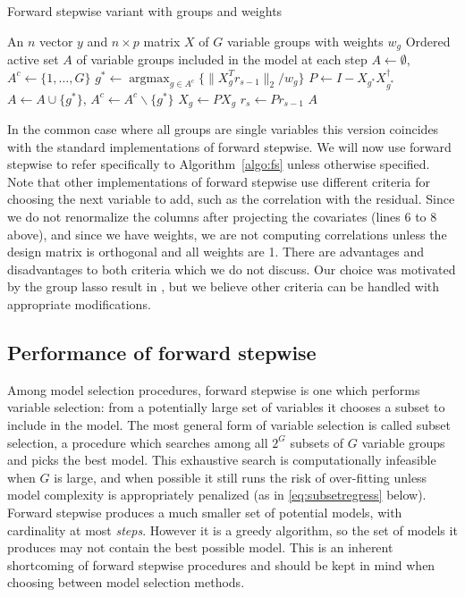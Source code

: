 \documentclass{imsart}
\newcommand{\argmax}{\mathop{\mathrm{argmax}}}
\newcommand{\norm}[1]{\lVert #1 \rVert}
\begin{document}
\begin{algorithm}
  \caption{Forward stepwise variant with groups and weights}
  \label{algo:fs}
  \begin{algorithmic}[1]
    \REQUIRE An $n$ vector $y$ and $n \times p$ matrix $X$ of $G$ variable groups with weights $w_g$
    \ENSURE Ordered active set $A$ of variable groups included in the model at each step
    \STATE $A \gets \emptyset$, $A^c \gets \{ 1, \ldots, G\}$
    \STATE $g^* \gets \argmax_{g \in A^c} \{ \norm{X_g^T r_{s-1}}_2 / w_g \}$
    \STATE $P \gets I - X_{g^*}X_{g^*}^\dagger$
    \STATE $A \gets A \cup \{ g^* \}$, $A^c \gets A^c \backslash \{ g^* \}$
      \STATE $X_g \gets P X_g$
    \ENDFOR
    \STATE $r_s \gets P r_{s-1}$
    \ENDFOR
    \RETURN $A$
  \end{algorithmic}
\end{algorithm}

In the common case where all groups are single variables this version
coincides with the standard implementations of forward stepwise.
We will now use forward stepwise to refer specifically to
Algorithm~\ref{algo:fs} unless otherwise specified. Note that other
implementations of forward stepwise use different criteria for choosing
the next variable to add, such as the correlation with the residual.
Since we do not renormalize the columns after projecting the covariates
(lines 6 to 8 above), and since we have weights, we are not computing
correlations unless the design matrix is orthogonal and all weights are 1.
There are advantages and disadvantages to both criteria which we do not
discuss. Our choice was motivated by the group lasso result in
\cite{tests:adaptive}, but we believe other criteria can be handled
with appropriate modifications.

\subsection{Performance of forward stepwise}

Among model selection procedures, forward stepwise is one which performs
variable selection: from a potentially large set of variables it chooses
a subset to include in the model. The most general form of variable
selection is called subset selection, a procedure which searches among
all $2^G$ subsets of $G$ variable groups and picks the best model.
This exhaustive search is computationally infeasible when $G$ is
large, and when possible it still
runs the risk of over-fitting unless model complexity is
appropriately penalized (as in \eqref{eq:subsetregress} below).
Forward stepwise produces a much
smaller set of potential models, with cardinality at most
\textit{steps}. However
it is a greedy algorithm, so the set of models it produces may not
contain the best possible model. This is an inherent shortcoming of
forward stepwise procedures and should be kept in mind when choosing
between model selection methods.
\end{document}
